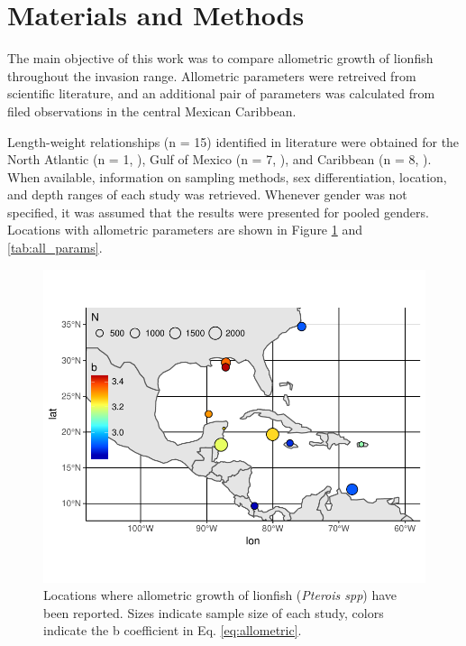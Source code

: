 \documentclass[fleqn,10pt,lineno]{wlpeerj} %
\theoremstyle{definition}
\theoremstyle{definition}
\theoremstyle{definition}
\theoremstyle{remark}
\begin{document}
\section*{Materials and Methods}

The main objective of this work was to compare allometric growth of
lionfish throughout the invasion range. Allometric parameters were
retreived from scientific literature, and an additional pair of
parameters was calculated from filed observations in the central Mexican
Caribbean.

Length-weight relationships (n = 15) identified in literature were
obtained for the North Atlantic (n = 1, \citet{barbour_2011}), Gulf of
Mexico (n = 7, \citet{aguilarperera_2016,fogg_2013,dahl_2014}), and
Caribbean (n = 8,
\citet{chin_2016,toledohernndez_2014,deleon_2013,edwards_2014,sabidoitza_2016,sandel_2015,darling_2011}).
When available, information on sampling methods, sex differentiation,
location, and depth ranges of each study was retrieved. Whenever gender
was not specified, it was assumed that the results were presented for
pooled genders. Locations with allometric parameters are shown in Figure
\ref{fig:map} and \ref{tab:all_params}.

\clearpage

\begin{figure}
\centering
\includegraphics{Manuscript_files/figure-latex/unnamed-chunk-1-1.pdf}
\caption{\label{fig:unnamed-chunk-1}\label{fig:map}Locations where
allometric growth of lionfish (\emph{Pterois spp}) have been reported.
Sizes indicate sample size of each study, colors indicate the b
coefficient in Eq. \ref{eq:allometric}.}
\end{figure}
\end{document}
